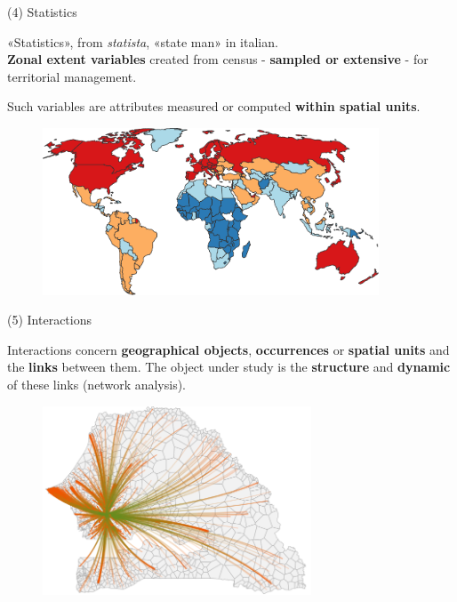 \begin{frame}{(4) Statistics}

«Statistics», from \textit{statista}, «state man»  in italian. \\
\textbf{Zonal extent variables} created from census - \textbf{sampled or extensive} - for territorial management.

Such variables are attributes measured or computed \textbf{within spatial units}.

\begin{figure}
  \includegraphics[width=10cm]{World.pdf}
\end{figure}

\end{frame}


\begin{frame}{(5) Interactions}

Interactions concern  \textbf{geographical objects},  \textbf{occurrences} or  \textbf{spatial units} and the \textbf{links} between them.
The object under study is the \textbf{structure} and \textbf{dynamic} of these links (network analysis).

\begin{figure}
  \includegraphics[width=8cm]{Interaction.png}
\end{figure}

\end{frame}


